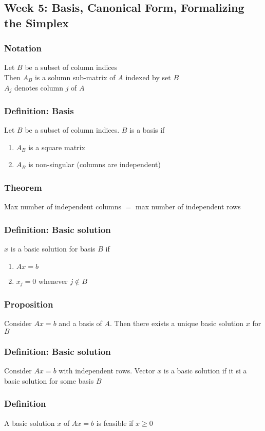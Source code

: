 \documentclass[11pt]{article}
\begin{document}
\subsection{Week 5: Basis, Canonical Form, Formalizing the Simplex}
\subsubsection{Notation}
Let $B$ be a subset of column indices \\
Then $A_B$ is a solumn sub-matrix of $A$ indexed by set $B$ \\
$A_j$ denotes column $j$ of $A$
\subsubsection{Definition: Basis}
Let $B$ be a subset of column indices. $B$ is a basis if
\begin{enumerate}
  \item $A_B$ is a square matrix 
  \item $A_B$ is non-singular (columns are independent)
\end{enumerate}
\subsubsection{Theorem}
Max number of independent columns $=$ max number of independent rows 
\subsubsection{Definition: Basic solution}
$x$ is a basic solution for basis $B$ if 
\begin{enumerate}
  \item $Ax=b$
  \item $x_j=0$ whenever $j\notin B$
\end{enumerate}
\subsubsection{Proposition}
Consider $Ax=b$ and a basis of $A$. Then there exists a unique basic solution $x$ for $B$
\subsubsection{Definition: Basic solution}
Consider $Ax=b$ with independent rows. Vector $x$ is a basic solution if it si a basic solution for some basis $B$
\subsubsection{Definition}
A basic solution $x$ of $Ax=b$ is feasible if $x\geq0$
\end{document}
